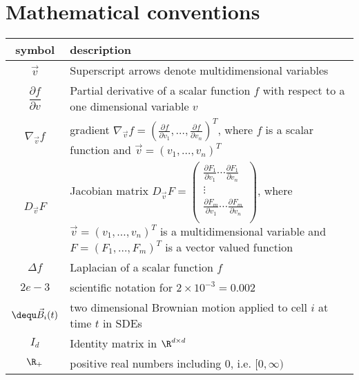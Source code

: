 \section*{Mathematical conventions}

\begin{table}[h!]
\centering
\begin{tabular}{c p{12cm}} %
\hline
symbol & description \\ 
\midrule
$\vec{v}$ & Superscript arrows denote multidimensional variables \\[0.5em] 
$\dfrac{\partial f}{\partial v}$ & Partial derivative of a scalar function $f$ with respect to a one dimensional variable $v$ \\[0.5em] 
$\nabla_{\vec{v}} f$  & gradient $\nabla_{\vec{v}} f = (\frac{\partial f}{\partial v_1}, \ldots, \frac{\partial f}{\partial v_n})^T$, where $f$ is a scalar function and $\vec{v} = (v_1, \ldots, v_n)^T$  \\[0.5em]
$D_{\vec{v}} F$ & Jacobian matrix $D_{\vec{v}} F = \begin{pmatrix}
    \frac{\partial F_1}{\partial v_1} \cdots \frac{\partial F_1}{\partial v_n} \\
    \vdots \\
    \frac{\partial F_m}{\partial v_1} \cdots \frac{\partial F_m}{\partial v_n} \\
\end{pmatrix}$, where $\vec{v} = (v_1, \ldots, v_n)^T$ is a multidimensional variable and $F = (F_1, \ldots, F_m)^T$ is a vector valued function \\
$\Delta f$ & Laplacian of a scalar function $f$ \\ 
$2e-3$ & scientific notation for $2 \times 10^{-3} = 0.002$ \\
$\dequ \vec{B}_i(t)$ & two dimensional Brownian motion applied to cell $i$ at time $t$ in SDEs \\
$I_d$ & Identity matrix in $\R^{d \times d}$  \\
$\R_+$ & positive real numbers including $0$, i.e. $[0, \infty)$  \\
\bottomrule
\end{tabular}
\end{table}